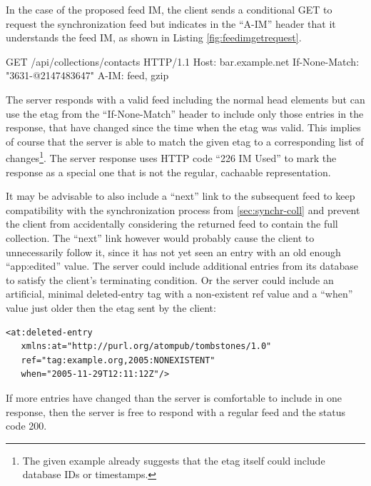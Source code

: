 \documentclass[11pt,a4paper,headsepline,twoside]{scrartcl}		%
\begin{document}
In the case of the proposed feed IM, the client sends a conditional GET to
request the synchronization feed but indicates in the ``A-IM'' header that it
understands the feed IM, as shown in Listing \ref{fig:feedimgetrequest}.

\begin{anylisting}[label=fig:feedimgetrequest,
                   float=h,
                   caption={HTTP GET request using feed delta encoding}]
GET /api/collections/contacts HTTP/1.1
Host: bar.example.net
If-None-Match: "3631-@2147483647"
A-IM: feed, gzip
\end{anylisting}

The server responds with a valid feed including the normal head elements but can
use the etag from the ``If-None-Match'' header to include only those entries in
the response, that have changed since the time when the etag was valid. This
implies of course that the server is able to match the given etag to a
corresponding list of changes\footnote{The given example already suggests that
  the etag itself could include database IDs or timestamps.}. The server
response uses HTTP code ``226 IM Used'' \cite{RFC3229} to mark the response as a
special one that is not the regular, cachaable representation.

It may be advisable to also include a ``next'' link to the subsequent feed to keep
compatibility with the synchronization process from \autoref{sec:synchr-coll}
and prevent the client from accidentally considering the returned feed to
contain the full collection. The ``next'' link however would probably cause the
client to unnecessarily follow it, since it has not yet seen an entry with an
old enough ``app:edited'' value. The server could include additional entries
from its database to satisfy the client's terminating condition. Or the server
could include an artificial, minimal
deleted-entry \cite{draft-snell-atompub-tombstones-14} tag with a non-existent
ref value and a ``when'' value just older then the etag sent by the client:

\begin{lstlisting}
<at:deleted-entry
   xmlns:at="http://purl.org/atompub/tombstones/1.0"
   ref="tag:example.org,2005:NONEXISTENT"
   when="2005-11-29T12:11:12Z"/>
\end{lstlisting}

If more entries have changed than the server is comfortable to include in one
response, then the server is free to respond with a regular feed and the status
code 200.
\end{document}
